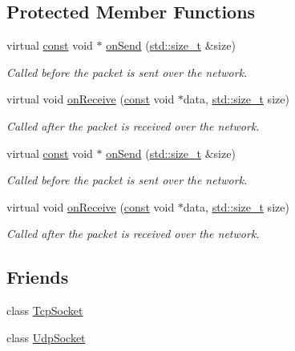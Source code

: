 \subsection*{Protected Member Functions}
\begin{DoxyCompactItemize}
\item 
virtual \hyperlink{term__entry_8h_a57bd63ce7f9a353488880e3de6692d5a}{const} void $\ast$ \hyperlink{classsf_1_1_packet_a052e955906c9bfd671622cb625380edc}{on\-Send} (\hyperlink{nc__alloc_8h_a7b60c5629e55e8ec87a4547dd4abced4}{std\-::size\-\_\-t} \&size)
\begin{DoxyCompactList}\small\item\em Called before the packet is sent over the network. \end{DoxyCompactList}\item 
virtual void \hyperlink{classsf_1_1_packet_ab71a31ef0f1d5d856de6f9fc75434128}{on\-Receive} (\hyperlink{term__entry_8h_a57bd63ce7f9a353488880e3de6692d5a}{const} void $\ast$data, \hyperlink{nc__alloc_8h_a7b60c5629e55e8ec87a4547dd4abced4}{std\-::size\-\_\-t} size)
\begin{DoxyCompactList}\small\item\em Called after the packet is received over the network. \end{DoxyCompactList}\item 
virtual \hyperlink{term__entry_8h_a57bd63ce7f9a353488880e3de6692d5a}{const} void $\ast$ \hyperlink{classsf_1_1_packet_a052e955906c9bfd671622cb625380edc}{on\-Send} (\hyperlink{nc__alloc_8h_a7b60c5629e55e8ec87a4547dd4abced4}{std\-::size\-\_\-t} \&size)
\begin{DoxyCompactList}\small\item\em Called before the packet is sent over the network. \end{DoxyCompactList}\item 
virtual void \hyperlink{classsf_1_1_packet_ab71a31ef0f1d5d856de6f9fc75434128}{on\-Receive} (\hyperlink{term__entry_8h_a57bd63ce7f9a353488880e3de6692d5a}{const} void $\ast$data, \hyperlink{nc__alloc_8h_a7b60c5629e55e8ec87a4547dd4abced4}{std\-::size\-\_\-t} size)
\begin{DoxyCompactList}\small\item\em Called after the packet is received over the network. \end{DoxyCompactList}\end{DoxyCompactItemize}
\subsection*{Friends}
\begin{DoxyCompactItemize}
\item 
class \hyperlink{classsf_1_1_packet_ae50c91e8e9046881024f96682796ccfa}{Tcp\-Socket}
\item 
class \hyperlink{classsf_1_1_packet_a7e0415ed4a34b5104f6b34682f602c6e}{Udp\-Socket}
\end{DoxyCompactItemize}


